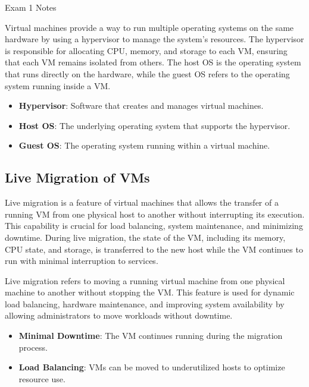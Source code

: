 \begin{examnotes}{Exam 1 Notes}
    \begin{highlight}
        Virtual machines provide a way to run multiple operating systems on the same hardware by using a hypervisor to manage the system's resources. The hypervisor is responsible for allocating CPU, 
        memory, and storage to each VM, ensuring that each VM remains isolated from others. The host OS is the operating system that runs directly on the hardware, while the guest OS refers to the 
        operating system running inside a VM.
        \begin{itemize}
            \item \textbf{Hypervisor}: Software that creates and manages virtual machines.
            \item \textbf{Host OS}: The underlying operating system that supports the hypervisor.
            \item \textbf{Guest OS}: The operating system running within a virtual machine.
        \end{itemize}
    \end{highlight}
    
    \subsection*{Live Migration of VMs}
    
    Live migration is a feature of virtual machines that allows the transfer of a running VM from one physical host to another without interrupting its execution. This capability is crucial for load 
    balancing, system maintenance, and minimizing downtime. During live migration, the state of the VM, including its memory, CPU state, and storage, is transferred to the new host while the VM 
    continues to run with minimal interruption to services.
    
    \begin{highlight}
        Live migration refers to moving a running virtual machine from one physical machine to another without stopping the VM. This feature is used for dynamic load balancing, hardware maintenance, 
        and improving system availability by allowing administrators to move workloads without downtime.
        \begin{itemize}
            \item \textbf{Minimal Downtime}: The VM continues running during the migration process.
            \item \textbf{Load Balancing}: VMs can be moved to underutilized hosts to optimize resource use.
        \end{itemize}
    \end{highlight}
    

\end{examnotes}
